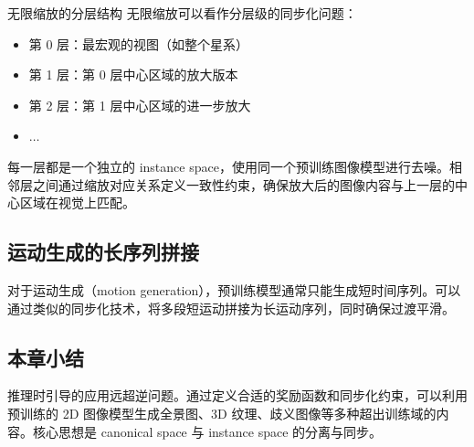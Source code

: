 \begin{knowledgebox}{无限缩放的分层结构}
无限缩放可以看作分层级的同步化问题：
\begin{itemize}
    \item 第 0 层：最宏观的视图（如整个星系）
    \item 第 1 层：第 0 层中心区域的放大版本
    \item 第 2 层：第 1 层中心区域的进一步放大
    \item $\ldots$
\end{itemize}
每一层都是一个独立的 instance space，使用同一个预训练图像模型进行去噪。相邻层之间通过缩放对应关系定义一致性约束，确保放大后的图像内容与上一层的中心区域在视觉上匹配。
\end{knowledgebox}

\subsection{运动生成的长序列拼接}

对于运动生成（motion generation），预训练模型通常只能生成短时间序列。可以通过类似的同步化技术，将多段短运动拼接为长运动序列，同时确保过渡平滑。

\subsection{本章小结}

推理时引导的应用远超逆问题。通过定义合适的奖励函数和同步化约束，可以利用预训练的 2D 图像模型生成全景图、3D 纹理、歧义图像等多种超出训练域的内容。核心思想是 canonical space 与 instance space 的分离与同步。


